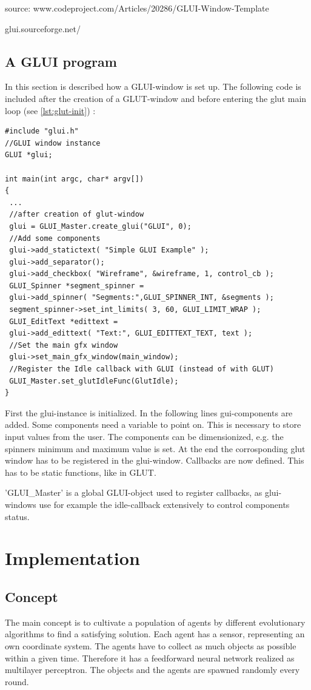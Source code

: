\documentclass[10pt,a4paper,DIV=11]{scrreprt}
\begin{document}
source: www.codeproject.com/Articles/20286/GLUI-Window-Template

glui.sourceforge.net/

\newpage

\section{A GLUI program}
In this section is described how a GLUI-window is set up.
The following code is included after the creation of a GLUT-window and before entering the glut main loop (see \ref{lst:glut-init}) :


\begin{lstlisting}[caption={Creating a GLUI-window},label=lst:glui-create]
#include "glui.h"
//GLUI window instance
GLUI *glui;

int main(int argc, char* argv[])
{
 ...
 //after creation of glut-window
 glui = GLUI_Master.create_glui("GLUI", 0);
 //Add some components
 glui->add_statictext( "Simple GLUI Example" );
 glui->add_separator();
 glui->add_checkbox( "Wireframe", &wireframe, 1, control_cb );
 GLUI_Spinner *segment_spinner =
 glui->add_spinner( "Segments:",GLUI_SPINNER_INT, &segments );
 segment_spinner->set_int_limits( 3, 60, GLUI_LIMIT_WRAP );
 GLUI_EditText *edittext =
 glui->add_edittext( "Text:", GLUI_EDITTEXT_TEXT, text );
 //Set the main gfx window
 glui->set_main_gfx_window(main_window);
 //Register the Idle callback with GLUI (instead of with GLUT)
 GLUI_Master.set_glutIdleFunc(GlutIdle);
}
\end{lstlisting}

First the glui-instance is initialized. In the following lines gui-components are added. Some components need a variable to point on. This is necessary to store input values from the user. The components can be dimensionized, e.g. the spinners minimum and maximum value is set.
At the end the corrosponding glut window has to be registered in the glui-window.
Callbacks are now defined. This has to be static functions, like in GLUT.

'GLUI\_Master' is a global GLUI-object used to register callbacks, as glui-windows use for example the idle-callback extensively to control components status.

\chapter{Implementation}

\section{Concept}
The main concept is to cultivate a population of agents by different evolutionary algorithms to find a satisfying solution. Each agent has a sensor, representing an own coordinate system. The agents have to collect as much objects as possible within a given time. Therefore it has a feedforward neural network realized as multilayer perceptron.
The objects and the agents are spawned randomly every round.
\end{document}
